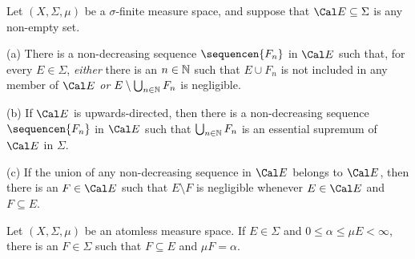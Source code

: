  Let $(X,\Sigma,\mu)$ be a $\sigma$-finite 
measure space, and suppose that $\Cal E\subseteq\Sigma$ is any non-empty 
set. 
      
(a) There is a non-decreasing sequence $\sequencen{F_n}$ in $\Cal E$ 
such that, for every $E\in\Sigma$, {\it either} there is an $n\in\Bbb N$ 
such that $E\cup F_n$ is not included in any member of $\Cal E$ {\it or} 
$E\setminus\bigcup_{n\in\Bbb N}F_n$ is negligible. 
      
(b) If $\Cal E$ is upwards-directed, then there is a non-decreasing 
sequence $\sequencen{F_n}$ in $\Cal E$ such that 
$\bigcup_{n\in\Bbb N}F_n$ is an essential supremum of $\Cal E$ in 
$\Sigma$. 
      
(c) If the union of any non-decreasing sequence in $\Cal E$ belongs to 
$\Cal E$, then there is an $F\in\Cal E$ such that $E\setminus F$ is 
negligible whenever $E\in\Cal E$ and $F\subseteq E$. 
      
      
 Let $(X,\Sigma,\mu)$ be an atomless measure 
space.   If $E\in\Sigma$ and $0\le\alpha\le\mu E<\infty$, there is an 
$F\in\Sigma$ such that $F\subseteq E$ and $\mu F=\alpha$. 
      
